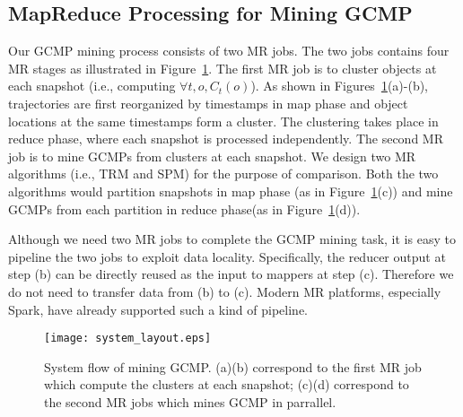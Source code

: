 \subsection{MapReduce Processing for Mining GCMP}
Our GCMP mining process consists of two MR jobs. The two jobs
contains four MR stages as illustrated in Figure~\ref{fig:overview}.
The first MR job is to cluster objects at each snapshot (i.e.,
computing $\forall t, o, C_t(o)$). As shown in Figures~\ref{fig:overview}(a)-(b),
trajectories are first reorganized by timestamps in map phase and object locations
at the same timestamps form a cluster. The clustering takes place in reduce phase, where
each snapshot is processed independently. The second MR job is to mine GCMPs from 
clusters at each snapshot. We design two MR algorithms (i.e., TRM and SPM) for 
the purpose of comparison. Both the two algorithms would partition snapshots in map phase
(as in Figure~\ref{fig:overview}(c))
and mine GCMPs from each partition in reduce phase(as in Figure~\ref{fig:overview}(d)).


Although we need two MR jobs to complete the GCMP mining task, 
it is easy to pipeline the two jobs to exploit data locality.
Specifically, the reducer output at step (b) can be directly reused 
as the input to mappers at step (c). Therefore we do not need to 
transfer data from (b) to (c). Modern MR platforms, especially Spark, have
already supported such a kind of pipeline.

\begin{figure} [t]
\center
\texttt{[image: system\_layout.eps]}
\caption{System flow of mining GCMP. (a)(b) correspond to the first MR job which compute the clusters at each snapshot; 
(c)(d) correspond to the second MR jobs which mines GCMP in parrallel.}
\label{fig:overview}
\end{figure}


